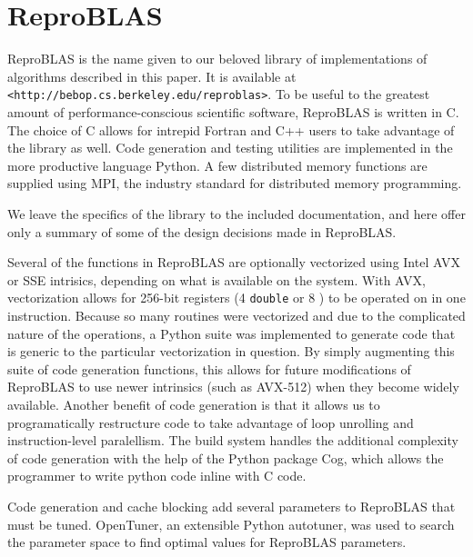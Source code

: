 \section{ReproBLAS}
  \label{sec:reproBLAS}
  ReproBLAS is the name given to our beloved library of implementations of algorithms described in this paper. 
  It is available at \texttt{<http://bebop.cs.berkeley.edu/reproblas>}. 
  To be useful to the greatest amount of performance-conscious scientific software, ReproBLAS is written in C.
  The choice of C allows for intrepid Fortran and C++ users to take advantage of the library as well.
  Code generation and testing utilities are implemented in the more productive language Python.
  A few distributed memory functions are supplied using MPI, the industry standard for distributed memory programming.

  We leave the specifics of the library to the included documentation, and here offer only a summary of some of the design decisions made in ReproBLAS.

  Several of the functions in ReproBLAS are optionally vectorized using Intel AVX or SSE intrisics, depending on what is available on the system. With AVX, vectorization allows for 256-bit registers (4 \texttt{double} or 8 ) to be operated on in one instruction. Because so many routines were vectorized and due to the complicated nature of the operations, a Python suite was implemented to generate code that is generic to the particular vectorization in question. By simply augmenting this suite of code generation functions, this allows for future modifications of ReproBLAS to use newer intrinsics (such as AVX-512) when they become widely available. Another benefit of code generation is that it allows us to programatically restructure code to take advantage of loop unrolling and instruction-level paralellism. The build system handles the additional complexity of code generation with the help of the Python package Cog, which allows the programmer to write python code inline with C code.

  Code generation and cache blocking add several parameters to ReproBLAS that must be tuned. OpenTuner, an extensible Python autotuner, was used to search the parameter space to find optimal values for ReproBLAS parameters.

